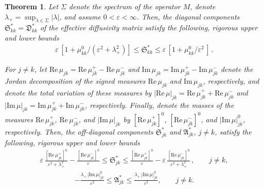 \documentclass[english,12pt,jmp,graphicx]{revtex4-1}
\newcommand{\Sg}{\mathfrak{S}}
\newcommand{\Ag}{\mathfrak{A}}
\newcommand{\Dg}{\mathfrak{D}}
\newtheorem{theorem}{Theorem}
\newcommand{\Real}{\mbox{Re}\,}
\newcommand{\Imag}{\mbox{Im}\,}
\begin{document}
\begin{theorem}\label{thm:Bounds}
  Let $\Sigma$ denote the spectrum of the operator $M$, denote
$\lambda_+=\sup_{\lambda\in\Sigma}|\lambda|$, and assume
$0<\varepsilon<\infty$. Then, the diagonal 
components $\Sg^*_{kk}=\Dg^*_{kk}$ of the effective diffusivity matrix
satisfy the following, rigorous upper~\cite{Avellaneda:CMP-339} and
lower bounds  
%
\begin{align}\label{eq:Lower_Upper_Bounds_Skk}
  \varepsilon\,[1+\mu_{kk}^0/(\varepsilon^2+\lambda_+^2)]\leq\Sg^*_{kk}\leq\varepsilon\,[1+\mu_{kk}^0/\varepsilon^2\,]\,.
\end{align}
%



For $j\ne k$, let $\Real\mu_{jk}=\Real\mu_{jk}^+-\Real\mu_{jk}^-$ and
$\Imag\mu_{jk}=\Imag\mu^+_{jk}-\Imag\mu^-_{jk}$ denote the Jordan 
decomposition of the signed measures $\Real\mu_{jk}$ and $\Imag\mu_{jk}$,
respectively, and denote the total variation of these measures by
$|\Real\mu|_{jk}=\Real\mu_{jk}^++\Real\mu_{jk}^-$ and
$|\Imag\mu|_{jk}=\Imag\mu^+_{jk}+\Imag\mu^-_{jk}$, 
respectively. Finally, denote the
masses of the measures $\Real\mu_{jk}^+$, $\Real\mu_{jk}^-$, and
$|\Imag\mu|_{jk}$ by $[\Real\mu_{jk}^+]^0$, $[\Real\mu_{jk}^-]^0$, and 
$|\Imag\mu|^0_{jk}$, respectively. Then, the off-diagonal components
$\Sg^*_{jk}$ and $\Ag^*_{jk}$, $j\ne k$, satisfy the following,
rigorous upper and lower bounds
%
\begin{align}\label{eq:Lower_Upper_Bounds_Sjk} 
  \varepsilon\,\frac{[\Real\mu_{jk}^+]^0}{\varepsilon^2+\lambda_+^2}-\frac{[\Real\mu_{jk}^-]^0}{\varepsilon}
  \leq\Sg^*_{jk}\leq
  \frac{[\Real\mu_{jk}^+]^0}{\varepsilon}-\varepsilon\,\frac{[\Real\mu_{jk}^-]^0}{\varepsilon^2+\lambda_+^2}\,,
  \qquad j\neq k,
\end{align}
%
%
\begin{align}\label{eq:Lower_Upper_Bounds_Ajk} 
  -\frac{\lambda_+\,|\Imag\mu|^0_{jk}}{\varepsilon^2}
  \leq \Ag^*_{jk} \leq
  \frac{\lambda_+\,|\Imag\mu|^0_{jk}}{\varepsilon^2},
  \qquad
  j\neq k.
\end{align}
%
\end{theorem}
\end{document}
